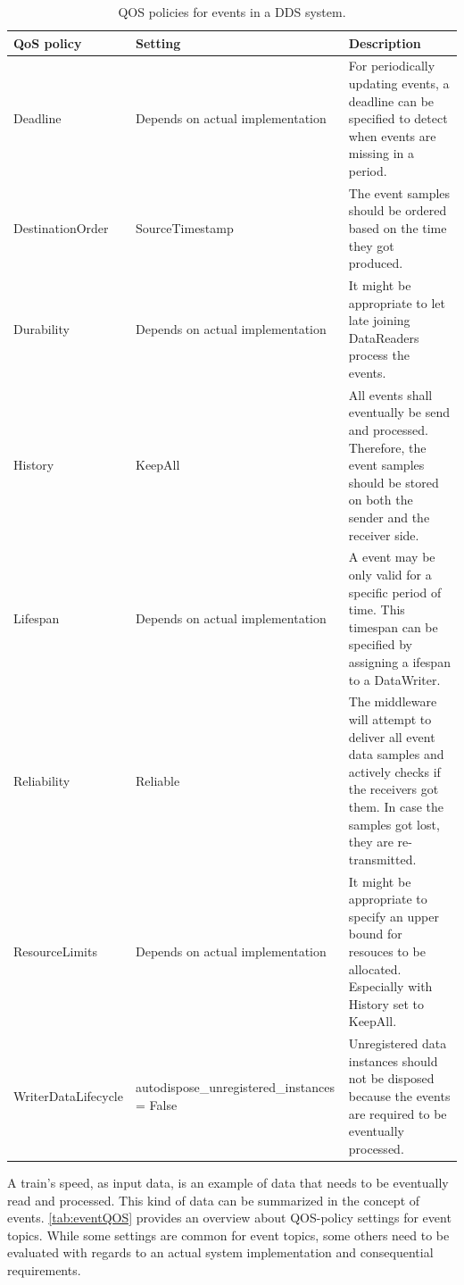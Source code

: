 \begin{table}[h!]
	\begin{center}
		\caption{\Gls*{QOS} policies for events in a \gls*{DDS} system.}
		\label{tab:eventQOS}
		\begin{tabularx}{\textwidth}{|X|X|X|}
			\hline
			\textbf{QoS policy} & \textbf{Setting} & \textbf{Description}\\
			\hline \hline
			Deadline & Depends on actual implementation & For periodically updating events, a deadline can be specified to detect when events are missing in a period. \\
			\hline
			DestinationOrder & SourceTimestamp & The event samples should be ordered based on the time they got produced. \\
			\hline
			Durability & Depends on actual implementation & It might be appropriate to let late joining DataReaders process the events. \\
			\hline
			History & KeepAll & All events shall eventually be send and processed. Therefore, the event samples should be stored on both the sender and the receiver side.  \\
			\hline
			Lifespan & Depends on actual implementation & A event may be only valid for a specific period of time. This timespan can be specified by assigning a ifespan to a DataWriter. \\
			\hline
			Reliability & Reliable & The middleware will attempt to deliver all event data samples and actively checks if the receivers got them. In case the samples got lost, they are re-transmitted. \\
			\hline
			ResourceLimits & Depends on actual implementation & It might be appropriate to specify an upper bound for resouces to be allocated. Especially with History set to KeepAll. \\
			\hline
			WriterDataLifecycle & autodispose\_unregistered\-\_instances = False & Unregistered data instances should not be disposed because the events are required to be eventually processed. \\
			\hline
		\end{tabularx}
	\end{center}
\end{table}

A train's speed, as input data, is an example of data that needs to be eventually read and processed.
This kind of data can be summarized in the concept of events.
\autoref{tab:eventQOS} provides an overview about \gls*{QOS}-policy settings for event topics.
While some settings are common for event topics, some others need to be evaluated with regards to an actual system implementation and consequential requirements.

